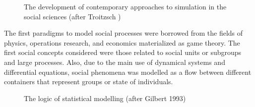\documentclass[11pt,oneside,a4paper,openright]{report}
\begin{document}
\begin{figure}[h]
\centering
\setlength\fboxsep{0pt}
\setlength\fboxrule{0.5pt}
\caption{The development of contemporary approaches to simulation in the social sciences (after Troitzsch )\cite{GilbertTroitzsch}}
\label{fig:SimTL}
\end{figure}


The first paradigms to model social processes were borrowed from the fields of physics, operations research, and economics materialized as game theory. The first social concepts considered were those related to social units or subgroups and large processes. Also, due to the main use of dynamical systems and differential equations, social phenomena was modelled as a flow between different containers that represent groups or state of individuals.\\

\begin{figure}[h]
\centering
\setlength\fboxsep{0pt}
\setlength\fboxrule{0.5pt}
\caption{The logic of statistical modelling (after Gilbert 1993)\cite{GilbertTroitzsch}}
\label{fig:SimTL}
\end{figure}
\end{document}
